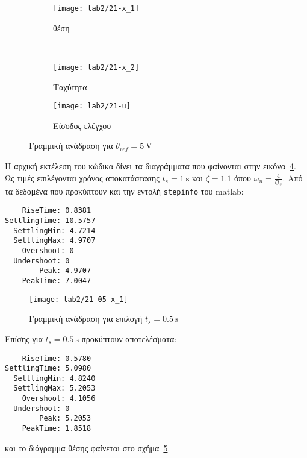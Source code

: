\begin{figure}
  \centering
  \begin{subfigure}[t]{\linewidth}
    \texttt{[image: lab2/21-x\_1]}
    \caption{θέση}
    \label{fig:21-x_1}
  \end{subfigure}\\
  \begin{subfigure}[t]{0.45\linewidth}
    \texttt{[image: lab2/21-x\_2]}
    \caption{Ταχύτητα}
    \label{fig:21-x_2}
  \end{subfigure}\hfill
  \begin{subfigure}[t]{0.45\linewidth}
    \texttt{[image: lab2/21-u]}
    \caption{Είσοδος ελέγχου}
    \label{fig:21-u}
  \end{subfigure}
  \caption[Γραμμική ανάδραση με σταθερή τάση αναφοράς]{Γραμμική ανάδραση για $\theta_{ref} = \SI{5}{\volt}$}
  \label{fig:21}
\end{figure}

Η αρχική εκτέλεση του κώδικα δίνει τα διαγράμματα που φαίνονται στην εικόνα~\ref{fig:21}.
Ως τιμές επιλέγονται χρόνος αποκατάστασης $t_s = \SI{1}{\second}$ και $\zeta = 1.1$
όπου $\omega_n = \frac{4}{\zeta t_s}$.
Από τα δεδομένα που προκύπτουν και την εντολή \texttt{stepinfo} του matlab:
\begin{code}
\begin{verbatim}
    RiseTime: 0.8381
SettlingTime: 10.5757
  SettlingMin: 4.7214
  SettlingMax: 4.9707
    Overshoot: 0
  Undershoot: 0
        Peak: 4.9707
    PeakTime: 7.0047
\end{verbatim}
\end{code}

\begin{figure}[htb]
  \centering
  \texttt{[image: lab2/21-05-x\_1]}
  \caption[Γραμμική ανάδραση με μειωμένο χρόνο αποκατάστασης]{Γραμμική ανάδραση για επιλογή $t_s = \SI{0.5}{\second}$}
  \label{fig:21-05}
\end{figure}

Επίσης για $t_s = \SI{0.5}{\second}$ προκύπτουν αποτελέσματα:
\begin{code}
\begin{verbatim}
    RiseTime: 0.5780
SettlingTime: 5.0980
  SettlingMin: 4.8240
  SettlingMax: 5.2053
    Overshoot: 4.1056
  Undershoot: 0
        Peak: 5.2053
    PeakTime: 1.8518
\end{verbatim}
\end{code}
και το διάγραμμα θέσης φαίνεται στο σχήμα~\ref{fig:21-05}.

